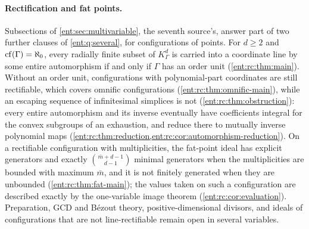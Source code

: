 \documentclass[11pt]{article}
\theoremstyle{plain}
\theoremstyle{plain}
\theoremstyle{plain}
\theoremstyle{definition}
\theoremstyle{definition}
\theoremstyle{definition}
\theoremstyle{definition}
\theoremstyle{remark}
\newcommand{\K}{K_\Gamma}\newcommand{\KD}{K_\Delta}
\begin{document}
\paragraph{Rectification and fat points.}
Subsections  of
\cref{ent:sec:multivariable}, the seventh source's, answer part of two further clauses of \cref{ent:q:several}, for
configurations of points. For $d\ge2$ and $\operatorname{cf}(\Gamma)=\aleph_0$, every
radially finite subset of $\K^d$ is carried into a coordinate line by some
entire automorphism if and only if $\Gamma$ has an order unit
(\cref{ent:rc:thm:main}). Without an order unit, configurations with
polynomial-part coordinates are still rectifiable, which covers omnific
configurations (\cref{ent:rc:thm:omnific-main}), while an escaping sequence
of infinitesimal simplices is not (\cref{ent:rc:thm:obstruction}): every
entire automorphism and its inverse eventually have coefficients integral for
the convex subgroups of an exhaustion, and reduce there to mutually inverse
polynomial maps (\cref{ent:rc:thm:reduction,ent:rc:cor:automorphism-reduction}).
On a rectifiable configuration with multiplicities, the fat-point ideal has
explicit generators and exactly $\binom{\bar m+d-1}{d-1}$ minimal generators
when the multiplicities are bounded with maximum $\bar m$, and it is not
finitely generated when they are unbounded (\cref{ent:rc:thm:fat-main}); the
values taken on such a configuration are described exactly by the
one-variable image theorem (\cref{ent:rc:cor:evaluation}). Preparation, GCD
and B\'ezout theory, positive-dimensional divisors, and ideals of
configurations that are not line-rectifiable remain open in several
variables.
\end{document}
